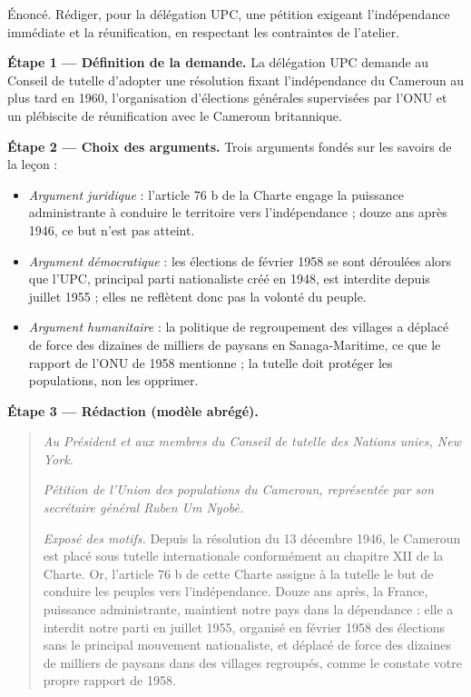 \documentclass[11pt]{article}
\begin{document}
\begin{exoresolu}
Énoncé. Rédiger, pour la délégation UPC, une pétition exigeant l'indépendance immédiate et la réunification, en respectant les contraintes de l'atelier.

\tcblower

\textbf{Étape 1 — Définition de la demande.} La délégation UPC demande au Conseil de tutelle d'adopter une résolution fixant l'indépendance du Cameroun au plus tard en 1960, l'organisation d'élections générales supervisées par l'ONU et un plébiscite de réunification avec le Cameroun britannique.

\textbf{Étape 2 — Choix des arguments.} Trois arguments fondés sur les savoirs de la leçon :
\begin{itemize}
\item \emph{Argument juridique} : l'article 76 b de la Charte engage la puissance administrante à conduire le territoire vers l'indépendance ; douze ans après 1946, ce but n'est pas atteint.
\item \emph{Argument démocratique} : les élections de février 1958 se sont déroulées alors que l'UPC, principal parti nationaliste créé en 1948, est interdite depuis juillet 1955 ; elles ne reflètent donc pas la volonté du peuple.
\item \emph{Argument humanitaire} : la politique de regroupement des villages a déplacé de force des dizaines de milliers de paysans en Sanaga-Maritime, ce que le rapport de l'ONU de 1958 mentionne ; la tutelle doit protéger les populations, non les opprimer.
\end{itemize}

\textbf{Étape 3 — Rédaction (modèle abrégé).}

\begin{quote}
\textit{Au Président et aux membres du Conseil de tutelle des Nations unies, New York.}

\textit{Pétition de l'Union des populations du Cameroun, représentée par son secrétaire général Ruben Um Nyobè.}

\textit{Exposé des motifs.} Depuis la résolution du 13 décembre 1946, le Cameroun est placé sous tutelle internationale conformément au chapitre XII de la Charte. Or, l'article 76 b de cette Charte assigne à la tutelle le but de conduire les peuples vers l'indépendance. Douze ans après, la France, puissance administrante, maintient notre pays dans la dépendance : elle a interdit notre parti en juillet 1955, organisé en février 1958 des élections sans le principal mouvement nationaliste, et déplacé de force des dizaines de milliers de paysans dans des villages regroupés, comme le constate votre propre rapport de 1958.


\end{quote}
\end{exoresolu}
\end{document}
